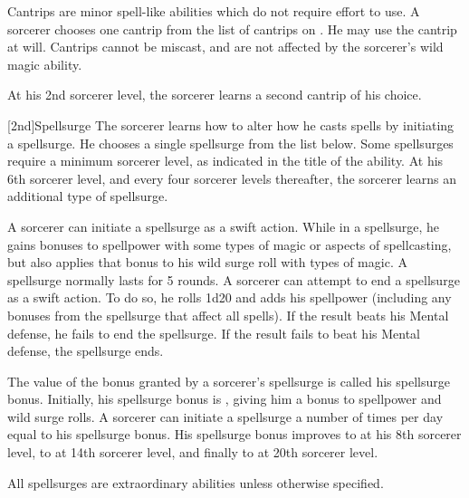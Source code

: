 Cantrips are minor spell-like abilities which do not require effort to use.
A sorcerer chooses one cantrip from the list of cantrips on .
He may use the cantrip at will.
Cantrips cannot be miscast, and are not affected by the sorcerer's wild magic ability.

At his 2nd sorcerer level, the sorcerer learns a second cantrip of his choice.

[2nd]{Spellsurge}
The sorcerer learns how to alter how he casts spells by initiating a spellsurge.
He chooses a single spellsurge from the list below.
Some spellsurges require a minimum sorcerer level, as indicated in the title of the ability.
At his 6th sorcerer level, and every four sorcerer levels thereafter, the sorcerer learns an additional type of spellsurge.

A sorcerer can initiate a spellsurge as a swift action.
While in a spellsurge, he gains bonuses to spellpower with some types of magic or aspects of spellcasting, but also applies that bonus to his wild surge roll with types of magic.
A spellsurge normally lasts for 5 rounds.
A sorcerer can attempt to end a spellsurge as a swift action.
To do so, he rolls 1d20 and adds his spellpower (including any bonuses from the spellsurge that affect all spells).
If the result beats his Mental defense, he fails to end the spellsurge.
If the result fails to beat his Mental defense, the spellsurge ends.

The value of the bonus granted by a sorcerer's spellsurge is called his spellsurge bonus.
Initially, his spellsurge bonus is , giving him a  bonus to spellpower and wild surge rolls.
A sorcerer can initiate a spellsurge a number of times per day equal to his spellsurge bonus.
His spellsurge bonus improves to  at his 8th sorcerer level, to  at 14th sorcerer level, and finally to  at 20th sorcerer level.

All spellsurges are extraordinary abilities unless otherwise specified.


